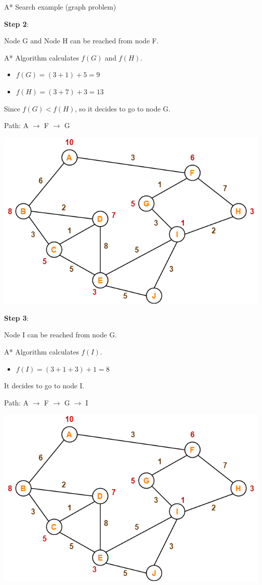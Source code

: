 \documentclass[9pt]{beamer}
\begin{document}
\begin{frame}{A* Search example (graph problem)}
\begin{small}
{\vspace{-1cm}

\textbf{Step 2}:

Node G and Node H can be reached from node F.

A* Algorithm calculates $f(G)$ and $f(H)$.

\begin{itemize}
    \item $f(G) = (3+1) + 5 = 9$
    \item $f(H) = (3+7) + 3 = 13$
\end{itemize}

Since $f(G) < f(H)$, so it decides to go to node G.

Path: \textcolor{CS-1}{A $\rightarrow$ F $\rightarrow$ G}
}

 {
\begin{center}
    \vspace{-0.5cm}
    \includegraphics[keepaspectratio, width=0.40\linewidth]{images/A-Algorithm-Problem-02.png}
\end{center}

\vspace{-1cm}

\textbf{Step 3}:

Node I can be reached from node G.

A* Algorithm calculates $f(I)$.

\begin{itemize}
    \item $f(I) = (3+1+3) + 1 = 8$
\end{itemize}

It decides to go to node I.

Path: \textcolor{CS-1}{A $\rightarrow$ F $\rightarrow$ G $\rightarrow$ I}
}

 {
\begin{center}
    \vspace{-0.4cm}
    \includegraphics[keepaspectratio, width=0.40\linewidth]{images/A-Algorithm-Problem-02.png}
\end{center}

}
\end{small}
\end{frame}
\end{document}
